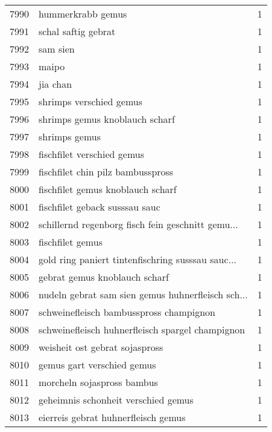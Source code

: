 \begin{tabular}{llr}
7990 &                                  hummerkrabb gemus &      1 \\
7991 &                                schal saftig gebrat &      1 \\
7992 &                                           sam sien &      1 \\
7993 &                                              maipo &      1 \\
7994 &                                           jia chan &      1 \\
7995 &                            shrimps verschied gemus &      1 \\
7996 &                     shrimps gemus knoblauch scharf &      1 \\
7997 &                                      shrimps gemus &      1 \\
7998 &                         fischfilet verschied gemus &      1 \\
7999 &                  fischfilet chin pilz bambusspross &      1 \\
8000 &                  fischfilet gemus knoblauch scharf &      1 \\
8001 &                     fischfilet geback susssau sauc &      1 \\
8002 &  schillernd regenborg fisch fein geschnitt gemu... &      1 \\
8003 &                                   fischfilet gemus &      1 \\
8004 &  gold ring paniert tintenfischring susssau sauc... &      1 \\
8005 &                      gebrat gemus knoblauch scharf &      1 \\
8006 &  nudeln gebrat sam sien gemus huhnerfleisch sch... &      1 \\
8007 &            schweinefleisch bambusspross champignon &      1 \\
8008 &   schweinefleisch huhnerfleisch spargel champignon &      1 \\
8009 &                     weisheit ost gebrat sojaspross &      1 \\
8010 &                         gemus gart verschied gemus &      1 \\
8011 &                         morcheln sojaspross bambus &      1 \\
8012 &                geheimnis schonheit verschied gemus &      1 \\
8013 &                eierreis gebrat huhnerfleisch gemus &      1 \\

\end{tabular}
